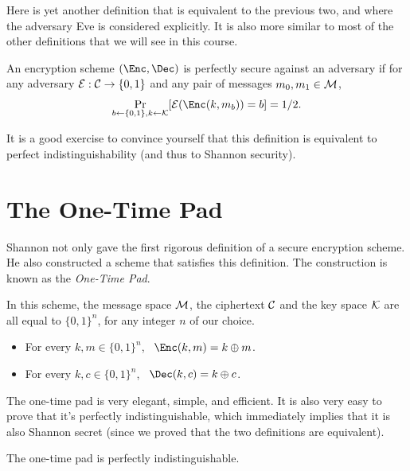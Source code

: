 Here is yet another definition that is equivalent to the previous two, and where the adversary Eve is considered explicitly. It is also more similar to most of the other definitions that we will see in this course. 
  

\begin{definition}
 An encryption scheme $(\Enc,\Dec)$ is perfectly secure against an adversary if for any adversary ${\cal E} : {\cal C} \rightarrow \{0,1\}$ and any pair of messages $m_0,m_1 \in{\cal M}$,
\[
\Pr_{b\gets\{0,1\}, k\gets{\cal K}}[{\cal E}(\Enc(k,m_b)) = b] = 1/2 .
\]
\end{definition} 
It is a good exercise to convince yourself that this definition is equivalent to perfect indistinguishability (and thus to Shannon security). 

\section{The One-Time Pad}
Shannon not only gave the first rigorous definition of a secure encryption scheme.  He also constructed a scheme that satisfies this definition.  The construction is known as the {\em One-Time Pad}.

In this scheme, the message space ${\cal M}$, the ciphertext ${\cal C}$ and the key space ${\cal K}$ are all equal to $\{0,1\}^n$, for any integer $n$ of our choice.
\begin{itemize}
    \item For every $k,m\in\{0,1\}^n$,~
    $\Enc(k,m)=k\oplus m$.
   
   \item For every $k,c\in\{0,1\}^n$,~
   $\Dec(k,c)=k\oplus c$.
\end{itemize}

The one-time pad is very elegant, simple, and  efficient. It is also very easy to prove that it’s perfectly indistinguishable, which immediately implies that it is also Shannon secret (since we proved that the two definitions are equivalent).

\begin{theorem}
    The one-time pad is perfectly indistinguishable.
\end{theorem}

